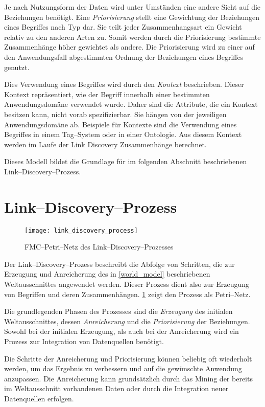 Je nach Nutzungsform der Daten wird unter Umständen eine andere Sicht auf die Beziehungen benötigt. Eine \emph{Priorisierung} stellt eine Gewichtung der Beziehungen eines Begriffes nach Typ dar. Sie teilt jeder Zusammenhangsart ein Gewicht relativ zu den anderen Arten zu. Somit werden durch die Priorisierung bestimmte Zusammenhänge höher gewichtet als andere. Die Priorisierung wird zu einer auf den Anwendungsfall abgestimmten Ordnung der Beziehungen eines Begriffes genutzt.

Dies Verwendung eines Begriffes wird durch den \emph{Kontext} beschrieben. Dieser Kontext repräsentiert, wie der Begriff innerhalb einer bestimmten Anwendungsdomäne verwendet wurde. Daher sind die Attribute, die ein Kontext besitzen kann, nicht vorab spezifizierbar. Sie hängen von der jeweiligen Anwendungsdomäne ab. Beispiele für Kontexte sind die Verwendung eines Begriffes in einem Tag--System oder in einer Ontologie. Aus diesem Kontext werden im Laufe der Link Discovery Zusammenhänge berechnet.

Dieses Modell bildet die Grundlage für  im folgenden Abschnitt beschriebenen Link--Discovery--Prozess.

\section{Link--Discovery--Prozess}
\label{ld_process}

\begin{figure}[ht]
\centering
\texttt{[image: link\_discovery\_process]}
\caption{FMC--Petri--Netz des Link--Discovery--Prozesses}
\label{fig:link_discovery_process}
\end{figure}

Der Link--Discovery--Prozess beschreibt die Abfolge von Schritten, die zur Erzeugung und Anreicherung des in \cref{world_model} beschriebenen Weltausschnittes angewendet werden. Dieser Prozess dient also zur Erzeugung von Begriffen und deren Zusammenhängen. \cref{fig:link_discovery_process} zeigt den Prozess als Petri--Netz.

Die grundlegenden Phasen des Prozesses sind die \emph{Erzeugung} des initialen Weltausschnittes, dessen \emph{Anreicherung} und die \emph{Priorisierung} der Beziehungen. Sowohl bei der initialen Erzeugung, als auch bei der Anreicherung wird ein Prozess zur Integration von Datenquellen benötigt.

Die Schritte der Anreicherung und Priorisierung können beliebig oft wiederholt werden, um das Ergebnis zu verbessern und auf die gewünschte Anwendung anzupassen. Die Anreicherung kann grundsätzlich durch das Mining der bereits im Weltausschnitt vorhandenen Daten oder durch die Integration neuer Datenquellen erfolgen.

